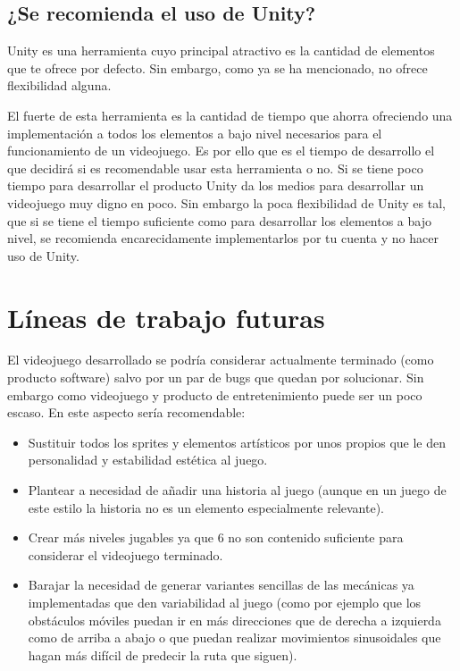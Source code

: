 \subsection{¿Se recomienda el uso de Unity?}
Unity es una herramienta cuyo principal atractivo es la cantidad de elementos que te ofrece por defecto. Sin embargo, como ya se ha mencionado, no ofrece flexibilidad alguna.

El fuerte de esta herramienta es la cantidad de tiempo que ahorra ofreciendo una implementación a todos los elementos a bajo nivel necesarios para el funcionamiento de un videojuego. Es por ello que es el tiempo de desarrollo el que decidirá si es recomendable usar esta herramienta o no. Si se tiene poco tiempo para desarrollar el producto Unity da los medios para desarrollar un videojuego muy digno en poco. Sin embargo la poca flexibilidad de Unity es tal, que si se tiene el tiempo suficiente como para desarrollar los elementos a bajo nivel, se recomienda encarecidamente implementarlos por tu cuenta y no hacer uso de Unity.

\section{Líneas de trabajo futuras}
El videojuego desarrollado se podría considerar actualmente terminado (como producto software) salvo por un par de bugs que quedan por solucionar. Sin embargo como videojuego y producto de entretenimiento puede ser un poco escaso.
En este aspecto sería recomendable:
\begin{itemize}
\item
Sustituir todos los sprites y elementos artísticos por unos propios que le den personalidad y estabilidad estética al juego.
\item
Plantear a necesidad de añadir una historia al juego (aunque en un juego de este estilo la historia no es un elemento especialmente relevante).
\item
Crear más niveles jugables ya que 6 no son contenido suficiente para considerar el videojuego terminado.
\item
Barajar la necesidad de generar variantes sencillas de las mecánicas ya implementadas que den variabilidad al juego (como por ejemplo que los obstáculos móviles puedan ir en más direcciones que de derecha a izquierda como de arriba a abajo o que puedan realizar movimientos sinusoidales que hagan más difícil de predecir la ruta que siguen).
\end{itemize}

